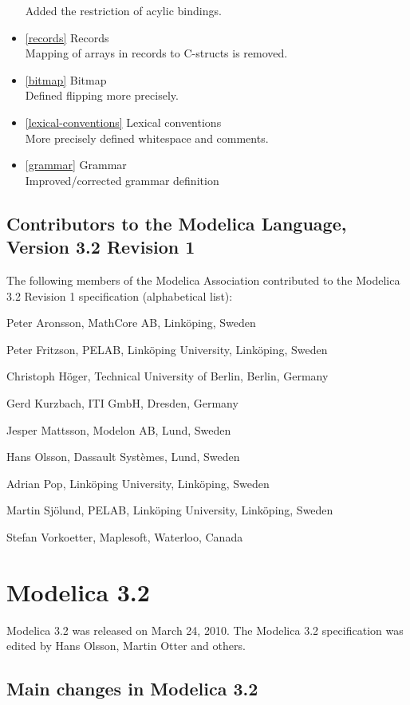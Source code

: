 \begin{itemize}
  Added the restriction of acylic bindings.
\item
  \ref{records} Records\\
  Mapping of arrays in records to C-structs is removed.
\item
  \ref{bitmap} Bitmap\\
  Defined flipping more precisely.
\item
  \ref{lexical-conventions} Lexical conventions\\
  More precisely defined whitespace and comments.
\item
  \ref{grammar} Grammar\\
  Improved/corrected grammar definition
\end{itemize}

\subsection{Contributors to the Modelica Language, Version 3.2 Revision 1}

The following members of the Modelica Association contributed to the
Modelica 3.2 Revision 1 specification (alphabetical list):

Peter Aronsson, MathCore AB, Linköping, Sweden

Peter Fritzson, PELAB, Linköping University, Linköping, Sweden

Christoph Höger, Technical University of Berlin, Berlin, Germany

Gerd Kurzbach, ITI GmbH, Dresden, Germany

Jesper Mattsson, Modelon AB, Lund, Sweden

Hans Olsson, Dassault Systèmes, Lund, Sweden

Adrian Pop, Linköping University, Linköping, Sweden

Martin Sjölund, PELAB, Linköping University, Linköping, Sweden

Stefan Vorkoetter, Maplesoft, Waterloo, Canada

\section{Modelica 3.2}

Modelica 3.2 was released on March 24, 2010. The Modelica 3.2
specification was edited by Hans Olsson, Martin Otter and others.

\subsection{Main changes in Modelica 3.2}

